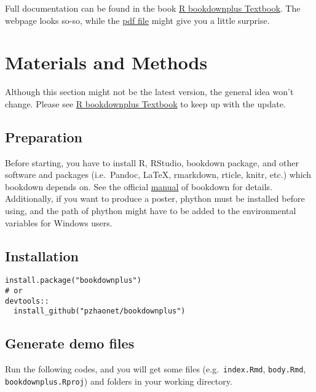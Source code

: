 \documentclass[bgd, online, hvmath]{style/copernicus-discussions}
\begin{document}
Full documentation can be found in the book \href{https://bookdown.org/baydap/bookdownplus}{R bookdownplus Textbook}. The webpage looks so-so, while the \href{https://bookdown.org/baydap/bookdownplus/bookdownplus.pdf}{pdf file} might give you a little surprise.

\hypertarget{materials-and-methods}{%
\section{Materials and Methods}\label{materials-and-methods}}

Although this section might not be the latest version, the general idea won't change. Please see \href{https://bookdown.org/baydap/bookdownplus}{R bookdownplus Textbook} to keep up with the update.

\hypertarget{preparation}{%
\subsection{Preparation}\label{preparation}}

Before starting, you have to install R, RStudio, bookdown package, and
other software and packages (i.e.~Pandoc, LaTeX, rmarkdown, rticle,
knitr, etc.) which bookdown depends on. See the official \href{https://bookdown.org/yihui/bookdown/}{manual} of
bookdown for details. Additionally, if you want to produce a poster, phython must be installed before using, and the path of phython might have to be added to the environmental variables for Windows users.

\hypertarget{installation}{%
\subsection{Installation}\label{installation}}

\begin{verbatim}
install.package("bookdownplus")
# or
devtools::
  install_github("pzhaonet/bookdownplus")
\end{verbatim}

\hypertarget{generate-demo-files}{%
\subsection{Generate demo files}\label{generate-demo-files}}

Run the following codes, and you will get some files (e.g.~\texttt{index.Rmd}, \texttt{body.Rmd}, \texttt{bookdownplus.Rproj}) and folders in your working directory.
\end{document}
